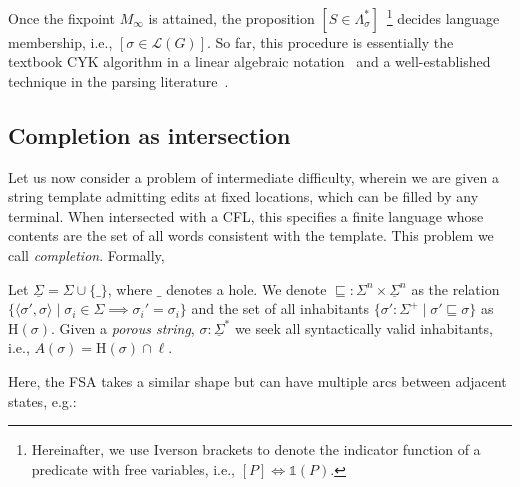 \documentclass[sigplan,review,acmsmall,nonacm,screen,anonymous]{acmart}\settopmatter{printfolios=false,printccs=false,printacmref=false}
\begin{document}
Once the fixpoint $M_\infty$ is attained, the proposition $[S \in \Lambda^*_\sigma]$~\footnote{Hereinafter, we use Iverson brackets to denote the indicator function of a predicate with free variables, i.e., $[P] \Leftrightarrow \mathds{1}(P)$.} decides language membership, i.e., $[\sigma \in \mathcal{L}(G)]$. So far, this procedure is essentially the textbook CYK algorithm in a linear algebraic notation~\cite{goodman1999semiring} and a well-established technique in the parsing literature~\cite{Grune2008}.

\subsection{Completion as intersection}

Let us now consider a problem of intermediate difficulty, wherein we are given a string template admitting edits at fixed locations, which can be filled by any terminal. When intersected with a CFL, this specifies a finite language whose contents are the set of all words consistent with the template. This problem we call \textit{completion}. Formally,

\begin{definition}[Completion]
  Let $\underline\Sigma = \Sigma \cup \{\_\}$, where $\_$ denotes a hole. We denote $\sqsubseteq: \Sigma^n \times \underline\Sigma^n$ as the relation $\{\langle\sigma', \sigma\rangle \mid \sigma_i \in \Sigma \implies \sigma_i' = \sigma_i\}$ and the set of all inhabitants $\{\sigma': \Sigma^+ \mid \sigma' \sqsubseteq \sigma\}$ as $\text{H}(\sigma)$. Given a \textit{porous string}, $\sigma: \underline\Sigma^*$ we seek all syntactically valid inhabitants, i.e., $A(\sigma)=\text{H}(\sigma)\cap\ell$.
\end{definition}

Here, the FSA takes a similar shape but can have multiple arcs between adjacent states, e.g.:

\begin{figure}[H]
\end{figure}
\end{document}
